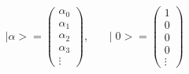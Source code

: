 \begin{equation}
\mid \alpha> = \left(
\begin{array}{c}
\alpha_{0} \\
\alpha_{1} \\
\alpha_{2} \\
\alpha_{3} \\
\vdots
\end{array}
\right),~~~~~~~\mid 0> = \left(
\begin{array}{c}
1 \\
0 \\
0 \\
0 \\
\vdots
\end{array}
\right)
\end{equation}


